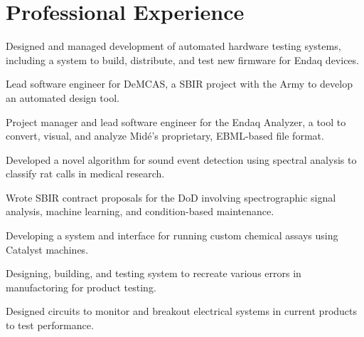 \documentclass[letterpaper]{deedy-resume} %
\begin{document}
%
\begin{minipage}[t]{0.66\textwidth} %


\section{Professional Experience}


\vspace{\topsep} %
\begin{tightitemize}
\item Designed and managed development of automated hardware testing systems, including a system to build, distribute, and test new firmware for Endaq devices.
\item Lead software engineer for DeMCAS, a SBIR project with the Army to develop an automated design tool.
\item Project manager and lead software engineer for the Endaq Analyzer, a tool to convert, visual, and analyze Midé's proprietary, EBML-based file format.
\item Developed a novel algorithm for sound event detection using spectral analysis to classify rat calls in medical research.
\item Wrote SBIR contract proposals for the DoD involving spectrographic signal analysis, machine learning, and condition-based maintenance.
\end{tightitemize}

\sectionspace %



\begin{tightitemize}
\item Developing a system and interface for running custom chemical assays using Catalyst machines.
\item Designing, building, and testing system to recreate various errors in manufactoring for product testing.
\item Designed circuits to monitor and breakout electrical systems in current products to test performance.
\end{tightitemize}


\end{minipage}
\end{document}
